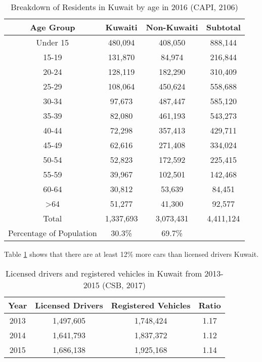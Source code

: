 \documentclass[preprint,12pt,a4paper,authoryear]{elsarticle}
\begin{document}
\begin{linenumbers}
\begin{table}[H]
\centering
\caption{Breakdown of Residents in Kuwait by age in 2016 (CAPI, 2106)}
\label{tb:residents}
\begin{tabular}{@{}cccc@{}}
\toprule
\textbf{Age Group} & \textbf{Kuwaiti} & \textbf{Non-Kuwaiti} & \textbf{Subtotal} \\ \midrule
Under 15 & 480,094 & 408,050 & 888,144 \\
15-19 & 131,870 & 84,974 & 216,844 \\
20-24 & 128,119 & 182,290 & 310,409 \\
25-29 & 108,064 & 450,624 & 558,688 \\
30-34 & 97,673 & 487,447 & 585,120 \\
35-39 & 82,080 & 461,193 & 543,273 \\
40-44 & 72,298 & 357,413 & 429,711 \\
45-49 & 62,616 & 271,408 & 334,024 \\
50-54 & 52,823 & 172,592 & 225,415 \\
55-59 & 39,967 & 102,501 & 142,468 \\
60-64 & 30,812 & 53,639 & 84,451 \\
\textgreater64 & 51,277 & 41,300 & 92,577 \\
Total & 1,337,693 & 3,073,431 & 4,411,124 \\
Percentage of Population & 30.3\% & 69.7\% &  \\ \bottomrule
\end{tabular}
\end{table}

Table \ref{tb:residents} shows that there are at least 12\% more cars than licensed drivers Kuwait.

\begin{table}[H]
\centering
\caption{Licensed drivers and registered vehicles in Kuwait from 2013-2015 (CSB, 2017)}
\label{tb:drivers}
\begin{tabular}{@{}cccc@{}}
\toprule
\textbf{Year} & \textbf{Licensed Drivers} & \textbf{Registered Vehicles} & \textbf{Ratio} \\ \midrule
2013 & 1,497,605 & 1,748,424 & 1.17 \\
2014 & 1,641,793 & 1,837,372 & 1.12 \\
2015 & 1,686,138 & 1,925,168 & 1.14 \\ \bottomrule
\end{tabular}
\end{table}


\end{linenumbers}
\end{document}
